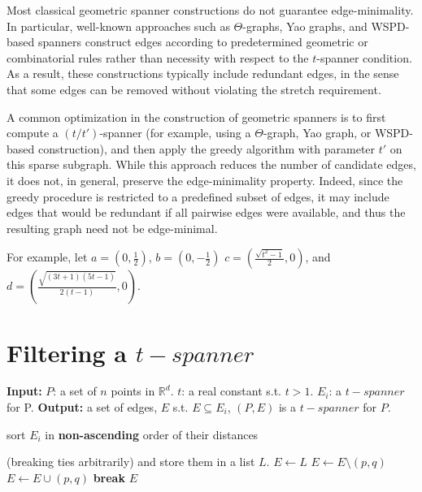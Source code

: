 \documentclass{article}
\begin{document}
Most classical geometric spanner constructions do not guarantee edge-minimality. In particular, well-known approaches such as $\Theta$-graphs, Yao graphs, and WSPD-based spanners construct edges according to predetermined geometric or combinatorial rules rather than necessity with respect to the $t$-spanner condition. As a result, these constructions typically include redundant edges, in the sense that some edges can be removed without violating the stretch requirement.

A common optimization in the construction of geometric spanners is to first compute a $(t/t')$-spanner (for example, using a $\Theta$-graph, Yao graph, or WSPD-based construction), and then apply the greedy algorithm with parameter $t'$ on this sparse subgraph. While this approach reduces the number of candidate edges, it does not, in general, preserve the edge-minimality property. Indeed, since the greedy procedure is restricted to a predefined subset of edges, it may include edges that would be redundant if all pairwise edges were available, and thus the resulting graph need not be edge-minimal.

For example, let $a=(0,\frac{1}{2})$, $b=(0,- \frac{1}{2})$ $c=(\frac{\sqrt{t^2-1}}{2} ,0)$, and $d=(\frac{\sqrt{(3t+1)(5t-1)}}{2(t-1)} ,0)$.


\section{Filtering a $t-spanner$}

\begin{algorithm}
\caption{Descending Greedy Filter on t-spanner}
\begin{algorithmic}[1]
\Statex \textbf{Input:} 
\Statex \hspace{1cm} $P$: a set of $n$ points in $\mathbb{R}^d$.
\Statex \hspace{1cm} $t$: a real constant s.t. $t > 1$.
\Statex \hspace{1cm} $E_i$: a $t-spanner$ for P.
\Statex \textbf{Output:} 
\Statex \hspace{1cm} a set of edges, $E$ s.t. $E \subseteq E_i$, $(P,E)$ is a $t-spanner$ for $P$.

\State sort $E_i$ in \textbf{non-ascending} order of their distances

(breaking ties arbitrarily) and store them in a list $L$.
\State $E \leftarrow L$ 
    \State $E \leftarrow E \setminus (p,q)$
            \State $E \leftarrow E \cup (p,q)$
            \State \textbf{break}
        \EndIf
    \EndFor
\EndFor
\State \Return $E$
\end{algorithmic}
\end{algorithm}
\end{document}
